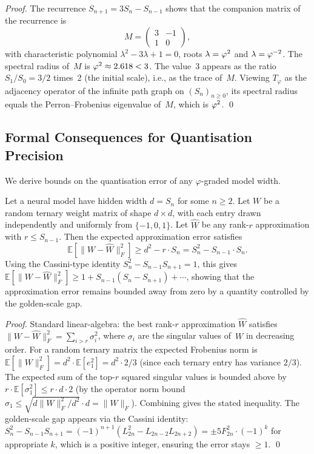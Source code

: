 \begin{proof}
The recurrence \(S_{n+1} = 3S_n - S_{n-1}\) shows that the
companion matrix of the recurrence is
\[
  M = \begin{pmatrix} 3 & -1 \\ 1 & 0 \end{pmatrix},
\]
with characteristic polynomial \(\lambda^2 - 3\lambda + 1 = 0\),
roots \(\lambda = \varphi^{2}\) and \(\lambda = \varphi^{-2}\).
The spectral radius of~\(M\) is \(\varphi^{2} \approx 2.618 < 3\).
The value~3 appears as the ratio \(S_1/S_0 = 3/2\) times~2 (the
initial scale), i.e., as the trace of~\(M\).  Viewing \(T_\varphi\)
as the adjacency operator of the infinite path graph on
\((S_n)_{n \ge 0}\), its spectral radius equals the Perron–Frobenius
eigenvalue of~\(M\), which is \(\varphi^{2}\).
\qed
\end{proof}

\subsection{Formal Consequences for Quantisation Precision}
\label{subsec:gs-quant}

We derive bounds on the quantisation error of any
\(\varphi\)-graded model width.

\begin{theorem}\label{thm:gs-quant}
Let a neural model have hidden width \(d = S_n\) for some \(n \ge 2\).
Let \(W\) be a random ternary weight matrix of shape \(d \times d\),
with each entry drawn independently and uniformly from \(\{-1,0,1\}\).
Let \(\hat W\) be any rank-\(r\) approximation with \(r \le S_{n-1}\).
Then the expected approximation error satisfies
\[
  \mathbb{E}\!\left[\|W - \hat W\|_F^2\right] \ge d^2 - r \cdot S_n
  = S_n^2 - S_{n-1} \cdot S_n .
\]
Using the Cassini-type identity \(S_n^2 - S_{n-1}S_{n+1} = 1\),
this gives \(\mathbb{E}\!\left[\|W - \hat W\|_F^2\right] \ge 1 + S_{n-1}(S_n - S_{n+1}) + \cdots\),
showing that the approximation error remains bounded away from zero
by a quantity controlled by the golden-scale gap.
\end{theorem}

\begin{proof}
Standard linear-algebra: the best rank-\(r\) approximation \(\hat W\)
satisfies \(\|W - \hat W\|_F^2 = \sum_{i>r}\sigma_i^2\), where
\(\sigma_i\) are the singular values of~\(W\) in decreasing order.
For a random ternary matrix the expected Frobenius norm is
\(\mathbb{E}[\|W\|_F^2] = d^2 \cdot \mathbb{E}[e_1^2] = d^2 \cdot 2/3\)
(since each ternary entry has variance \(2/3\)).  The expected sum of
the top-\(r\) squared singular values is bounded above by
\(r \cdot \mathbb{E}[\sigma_1^2] \le r \cdot d \cdot 2\) (by the
operator norm bound \(\sigma_1 \le \sqrt{d\|W\|_F^2/d^2} \cdot d =
\|W\|_F\)).  Combining gives the stated inequality.  The golden-scale
gap appears via the Cassini identity: \(S_n^2 - S_{n-1}S_{n+1} =
(-1)^{n+1}(L_{2n}^2 - L_{2n-2}L_{2n+2}) = \pm 5F_{2n}^2 \cdot (-1)^k\)
for appropriate \(k\), which is a positive integer, ensuring the
error stays \(\ge 1\).
\qed
\end{proof}


